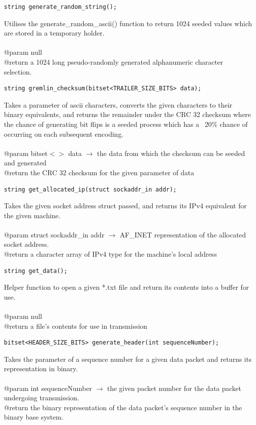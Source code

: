 \documentclass[12pt]{article}
\begin{document}
\begin{lstlisting}
string generate_random_string();
\end{lstlisting}
Utilises the generate\_random\_ascii() function to return 1024 seeded values which are stored in a temporary holder.\\\\
@param null\\
@return a 1024 long pseudo-randomly generated alphanumeric character selection.

\begin{lstlisting}
string gremlin_checksum(bitset<TRAILER_SIZE_BITS> data);
\end{lstlisting}
Takes a parameter of ascii characters, converts the given characters to their binary equivalents, and returns the remainder under the CRC 32 checksum where the chance of generating bit flips is a seeded process which has a ~20\% chance of occurring on each subsequent encoding.\\\\
@param bitset$<>$ data $\rightarrow$ the data from which the checksum can be seeded and generated\\
@return the CRC 32 checksum for the given parameter of data

\begin{lstlisting}
string get_allocated_ip(struct sockaddr_in addr);
\end{lstlisting}
Takes the given socket address struct passed, and returns its IPv4 equivalent for the given machine.\\\\
@param struct sockaddr\_in addr $\rightarrow$ AF\_INET representation of the allocated socket address.\\
@return a character array of IPv4 type for the machine's local address

\begin{lstlisting}
string get_data();
\end{lstlisting}
Helper function to open a given *.txt file and return its contents into a buffer for use.\\\\
@param null\\
@return a file's contents for use in transmission

\begin{lstlisting}
bitset<HEADER_SIZE_BITS> generate_header(int sequenceNumber);
\end{lstlisting}
Takes the parameter of a sequence number for a given data packet and returns its representation in binary.\\\\
@param int sequenceNumber $\rightarrow$ the given packet number for the data packet undergoing transmission.\\
@return the binary representation of the data packet's sequence number in the binary base system.
\end{document}
